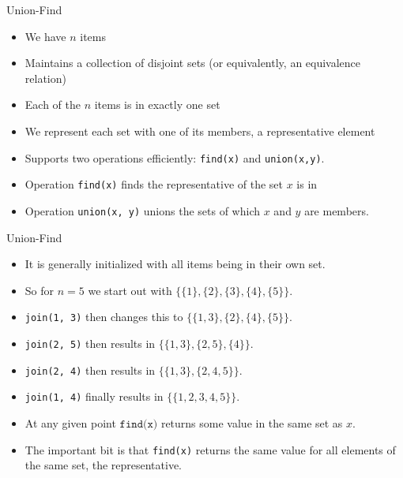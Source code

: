 \documentclass{beamer}
\begin{document}
\begin{frame}[plain]{Union-Find}
    \begin{itemize}
        \item<1-> We have $n$ items
        \item<2-> Maintains a collection of disjoint sets (or equivalently, an equivalence relation)
        \item<3-> Each of the $n$ items is in exactly one set
        \item<4-> We represent each set with one of its members, a representative element
        \item<5-> Supports two operations efficiently: \texttt{find(x)} and \texttt{union(x,y)}.
        \item<6-> Operation \texttt{find(x)} finds the representative of the set $x$ is in
        \item<7-> Operation \texttt{union(x, y)} unions the sets of which $x$ and $y$ are members.
    \end{itemize}
\end{frame}

\begin{frame}[plain]{Union-Find}
    \begin{itemize}
        \item<1-> It is generally initialized with all items being in their own set.
        \item<2-> So for $n = 5$ we start out with $\{\{1\},\{2\},\{3\},\{4\},\{5\}\}$.
        \item<3-> \texttt{join(1, 3)} then changes this to $\{\{1, 3\}, \{2\}, \{4\}, \{5\}\}$.
		\item<4-> \texttt{join(2, 5)} then results in $\{\{1, 3\}, \{2, 5\}, \{4\}\}$.
		\item<5-> \texttt{join(2, 4)} then results in $\{\{1, 3\}, \{2, 4, 5\}\}$.
		\item<6-> \texttt{join(1, 4)} finally results in $\{\{1, 2, 3, 4, 5\}\}$.
        \item<7-> At any given point $\texttt{find(x)}$ returns some value in the same set as $x$.
        \item<8-> The important bit is that \texttt{find(x)} returns the same value for all elements of the same set, the representative.
    \end{itemize}
\end{frame}
\end{document}
